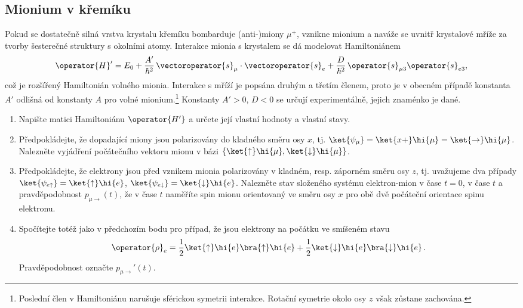 \subsection{Mionium v křemíku}	
	Pokud se dostatečně silná vrstva krystalu křemíku bombarduje (anti-)miony $\mu^{+}$, vznikne mionium a naváže se uvnitř krystalové mříže za tvorby šesterečné struktury s okolními atomy.
	Interakce mionia s krystalem se dá modelovat Hamiltoniánem
	\begin{equation}
		\operator{H}'=E_{0}+\frac{A'}{\hbar^{2}}\,\vectoroperator{s}_{\mu}\cdot\vectoroperator{s}_{e}+\frac{D}{\hbar^{2}}\,\operator{s}_{\mu3}\operator{s}_{e3},
	\end{equation}
	což je rozšířený Hamiltonián volného mionia.
	Interakce s mříží je popsána druhým a třetím členem, proto je v obecném případě konstanta $A'$ odlišná od konstanty $A$ pro volné mionium.\footnote{
		Poslední člen v Hamiltoniánu narušuje sférickou symetrii interakce.
		Rotační symetrie okolo osy $z$ však zůstane zachována.
	}
	Konstanty $A'>0$, $D<0$ se určují experimentálně, jejich znaménko je dané.
	
	\begin{enumerate}
	\item 
		Napište matici Hamiltoniánu $\operator{H'}$ a určete její vlastní hodnoty a vlastní stavy.
	
	\item 
		Předpokládejte, že dopadající miony jsou polarizovány do kladného směru osy $x$, tj. $\ket{\psi_{\mu}}=\ket{x+}\hi{\mu}=\ket{\rightarrow}\hi{\mu}$.
		Nalezněte vyjádření počátečního vektoru mionu v bázi $\left\{\ket{\uparrow}\hi{\mu},\ket{\downarrow}\hi{\mu}\right\}$.
		
	\item 
		Předpokládejte, že elektrony jsou před vznikem mionia polarizovány v kladném, resp. záporném směru osy $z$,
		tj. uvažujeme dva případy $\ket{\psi_{e\uparrow}}=\ket{\uparrow}\hi{e}$, $\ket{\psi_{e\downarrow}}=\ket{\downarrow}\hi{e}$.
		Nalezněte stav složeného systému elektron-mion v čase $t=0$, v čase $t$	a pravděpodobnost $p_{\mu\rightarrow}(t)$, že v čase $t$ naměříte spin mionu orientovaný ve směru osy $x$ pro obě dvě počáteční orientace spinu elektronu.
	
	\item 
		Spočítejte totéž jako v předchozím bodu pro případ, že jsou elektrony na počátku
		ve smíšeném stavu
		\begin{equation}
			\operator{\rho}_{e}
				=\frac{1}{2}\ket{\uparrow}\hi{e}\bra{\uparrow}\hi{e}
				+\frac{1}{2}\ket{\downarrow}\hi{e}\bra{\downarrow}\hi{e}\,.
		\end{equation}
		Pravděpodobnost označte $p_{\mu\rightarrow}'(t)$.
	\end{enumerate}

